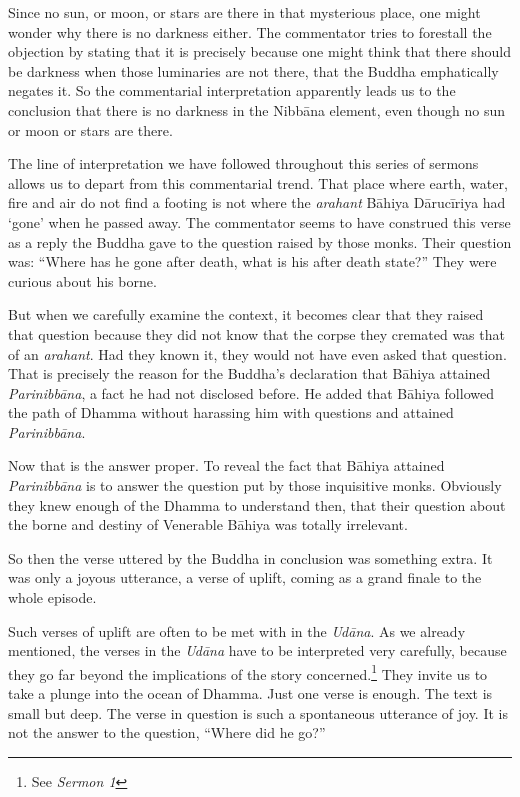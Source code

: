Since no sun, or moon, or stars are there in that mysterious place, one might wonder why there is no darkness either. The commentator tries to forestall the objection by stating that it is precisely because one might think that there should be darkness when those luminaries are not there, that the Buddha emphatically negates it. So the commentarial interpretation apparently leads us to the conclusion that there is no darkness in the Nibbāna element, even though no sun or moon or stars are there.

The line of interpretation we have followed throughout this series of sermons allows us to depart from this commentarial trend. That place where earth, water, fire and air do not find a footing is not where the \emph{arahant} Bāhiya Dārucīriya had `gone' when he passed away. The commentator seems to have construed this verse as a reply the Buddha gave to the question raised by those monks. Their question was: ``Where has he gone after death, what is his after death state?'' They were curious about his borne.

But when we carefully examine the context, it becomes clear that they raised that question because they did not know that the corpse they cremated was that of an \emph{arahant}. Had they known it, they would not have even asked that question. That is precisely the reason for the Buddha's declaration that Bāhiya attained \emph{Parinibbāna}, a fact he had not disclosed before. He added that Bāhiya followed the path of Dhamma without harassing him with questions and attained \emph{Parinibbāna}.

Now that is the answer proper. To reveal the fact that Bāhiya attained \emph{Parinibbāna} is to answer the question put by those inquisitive monks. Obviously they knew enough of the Dhamma to understand then, that their question about the borne and destiny of Venerable Bāhiya was totally irrelevant.

So then the verse uttered by the Buddha in conclusion was something extra. It was only a joyous utterance, a verse of uplift, coming as a grand finale to the whole episode.

Such verses of uplift are often to be met with in the \emph{Udāna}. As we already mentioned, the verses in the \emph{Udāna} have to be interpreted very carefully, because they go far beyond the implications of the story concerned.\footnote{See \emph{Sermon 1}} They invite us to take a plunge into the ocean of Dhamma. Just one verse is enough. The text is small but deep. The verse in question is such a spontaneous utterance of joy. It is not the answer to the question, ``Where did he go?''


